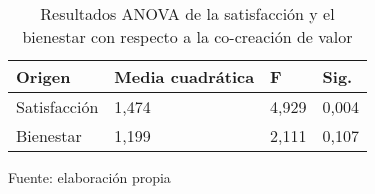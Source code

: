 \begin{table}[h]
    \caption {Resultados ANOVA de la satisfacción y el bienestar con respecto a la co-creación de valor}
	\label{tab:anovaSB}
	\setlength\extrarowheight{5pt}
	
	\begin{tabular}{p{4.0cm} p{4.6cm} p{3.1cm} p{2.1cm}}
	\toprule
	Origen	& Media cuadrática	& F & Sig. \\
	\midrule
	Satisfacción & 1,474	& 4,929	& 0,004 \\
	Bienestar	 & 1,199	& 2,111	& 0,107 \\
	\bottomrule
	\end{tabular}
	
	\center
	\footnotesize
	Fuente: elaboración propia
\end{table}

